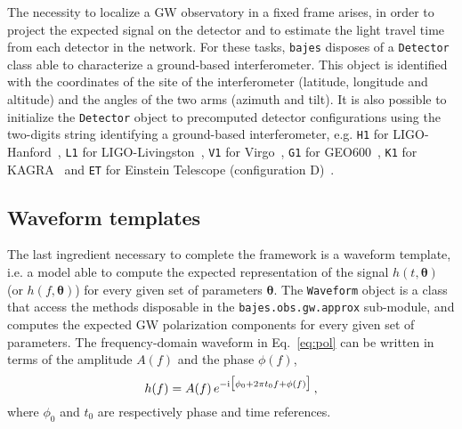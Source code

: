 \documentclass[prd,aps,twocolumn,a4paper,showkeys,nofootinbib,floatfix]{revtex4-1}
\newcommand{\be}{\begin{equation}}
\newcommand{\ee}{\end{equation}}
\def\i{{\rm i}}
\def\params{\boldsymbol{\theta}}
\newcommand{\bajes}{{\tt bajes}}
\begin{document}
The necessity to localize a GW observatory in a fixed frame arises,
in order to project the expected signal on the detector and to 
estimate the light travel time from each detector in the network. 
For these tasks, {\bajes} disposes of a {\tt Detector} class 
able to characterize a ground-based interferometer.
This object is identified with the 
coordinates of the site of the interferometer 
(latitude, longitude and altitude) and the angles of the two arms (azimuth and tilt).
It is also possible to initialize the {\tt Detector} object
to precomputed detector configurations
using the two-digits string 
identifying a ground-based interferometer, e.g. 
{\tt H1} for LIGO-Hanford~\cite{TheLIGOScientific:2014jea},
{\tt L1} for LIGO-Livingston~\cite{TheLIGOScientific:2014jea},
{\tt V1} for Virgo~\cite{TheVirgo:2014hva},
{\tt G1} for GEO600~\cite{Luck:2010rt,Dooley:2014nga},
{\tt K1} for KAGRA~\cite{Aso:2013eba,Akutsu:2020his}
and {\tt ET} for Einstein Telescope (configuration D)~\cite{Punturo:2010zz,Hild:2010id}.

\subsection{Waveform templates} 
\label{sec:wave}

The last ingredient necessary to complete the framework is a waveform template,
i.e. a model able to compute the expected representation of the signal $h(t,\params)$ 
(or ${h}(f,\params)$)
for every given set of parameters $\params$.
The {\tt Waveform} object is a class that access the methods 
disposable in the {\tt bajes.obs.gw.approx}
sub-module,
and computes the expected
GW polarization components for every given set of parameters. 
The frequency-domain waveform in Eq.~\eqref{eq:pol}
can be written in terms of the 
amplitude $A(f)$ and the phase $\phi(f)$, 
\be
\label{eq:h_ampphi}
 h(f) = A(f) \, e^{-\i \big[\phi_0 + 2 \pi t_0 f + \phi(f)\big]}\,, 
\ee
where $\phi_0$ and $t_0$ are respectively phase and time references. 
\end{document}
